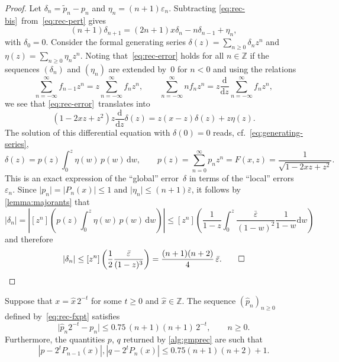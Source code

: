 \documentclass[nohypdvips,review]{siamart0216}
\newcommand{\abs}[1]{\mathopen| #1 \mathclose|}
\newcommand{\dw}{\mathrm d w}
\newcommand{\ddz}{\frac{\mathrm d}{\mathrm dz}}
\begin{document}
\begin{proof}
Let
$\delta_n = \tilde{p}_n - p_n$
and
$\eta_n = (n + 1) \varepsilon_n$.
Subtracting \cref{eq:rec-bis} from \cref{eq:rec-pert} gives
\begin{equation} \label{eq:rec-error}
  (n + 1) \delta_{n + 1}
  = (2 n + 1) x \delta_n - n \delta_{n - 1} + \eta_n,
\end{equation}
with $\delta_0 = 0$.
Consider the formal generating series
$\delta(z) = \sum_{n \geq 0} \delta_n z^n$
and
$\eta(z) = \sum_{n \geq 0} \eta_n z^n$.
Noting that \cref{eq:rec-error} holds for all $n \in \mathbb{Z}$ if
the sequences $(\delta_n)$ and $(\eta_n)$ are extended by~$0$ for
$n < 0$
and using the relations
\[
  \sum_{n=-\infty}^{\infty} f_{n - 1} z^n
  = z \sum_{n=-\infty}^{\infty} f_n z^n,
  \qquad
  \sum_{n=-\infty}^{\infty} n f_{n} z^n
  = z \ddz \sum_{n=-\infty}^{\infty} f_n z^n,
\]
we see that \cref{eq:rec-error} translates into
\[ (1 - 2 xz + z^2) z \ddz \delta (z)
   = z (x - z) \delta (z) + z \eta (z). \]
The solution of this differential equation with $\delta (0) = 0$ reads,
cf.~\cref{eq:generating-series},
\[ \delta(z) = p(z)  \int_0^z \eta(w) \, p(w) \, \dw,
   \qquad
   p(z) = \sum_{n=0}^{\infty} p_n z^n
        = F(x, z)
        = \frac{1}{\sqrt{1 - 2 xz + z^2}}. \]
This is an exact expression of the ``global'' error $\delta$ in terms
of the ``local'' errors~$\varepsilon_n$.
Since $\abs{p_n} = \abs{P_n(x)} \leq 1$
and $\abs{\eta_n} \leq (n+1) \bar \varepsilon$,
it follows by \cref{lemma:majorants} that
\[
  \abs{\delta_n}
  = \left| [z^n] \left( p(z)  \int_0^z \eta(w) \, p(w) \, \dw \right) \right|
  \leq [z^n] \left(
    \frac{1}{1-z}
    \int_0^z \frac{\bar \varepsilon}{(1 - w)^2} \frac{1}{1-w} \dw \right)
\]
and therefore
\[
  \abs{\delta_n}
  \leq [z^n] \left( \frac12 \frac{\bar \varepsilon}{(1-z)^3} \right)
  = \frac{(n+1)(n+2)}{4} \, \bar \varepsilon. \qed
\]
\end{proof}

\begin{corollary}
\label{cor:bound-gmprec}
Suppose that $x = \hat x \, 2^{-t}$ for some $t \geq 0$ and
$\hat x \in \mathbb Z$.
The sequence $(\hat p_n)_{n \geq 0}$ defined by \cref{eq:rec-fxpt}
satisfies
\begin{equation} \label{eq:bound-fxprec}
  \abs{ \hat p_n 2^{-t} - p_n }
  \leq 0.75 \, (n+1) (n+1) \, 2^{-t},
  \qquad
  n \geq 0.
\end{equation}
Furthermore, the quantities $p$, $q$ returned by \cref{alg:gmprec}
are such that
\begin{equation} \label{eq:bound-gmprec}
  |p - 2^t P_{n-1}(x)|, |q - 2^t P_{n}(x)|
  \le 0.75 (n+1)(n+2) + 1.
\end{equation}
\end{corollary}
\end{document}
